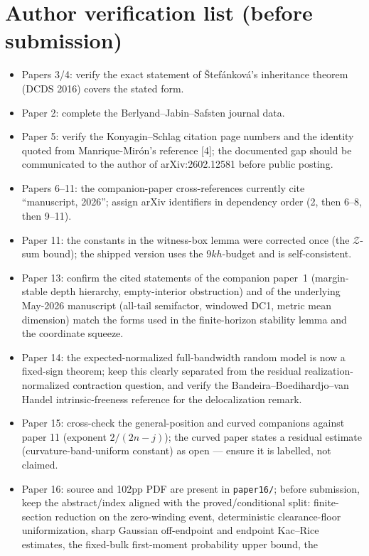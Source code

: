 \documentclass[11pt]{article}
\begin{document}
\section*{Author verification list (before submission)}

\begin{itemize}
\item Papers 3/4: verify the exact statement of \v{S}tef\'ankov\'a's
inheritance theorem (DCDS 2016) covers the stated form.
\item Paper 2: complete the Berlyand--Jabin--Safsten journal data.
\item Paper 5: verify the Konyagin--Schlag citation page numbers and the
identity quoted from Manrique-Mir\'on's reference [4]; the documented gap
should be communicated to the author of arXiv:2602.12581 before public
posting.
\item Papers 6--11: the companion-paper cross-references currently cite
``manuscript, 2026''; assign arXiv identifiers in dependency order (2, then
6--8, then 9--11).
\item Paper 11: the constants in the witness-box lemma were corrected once
(the $\mathcal Z$-sum bound); the shipped version uses the
$9kh$-budget and is self-consistent.
\item Paper 13: confirm the cited statements of the companion paper~1
(margin-stable depth hierarchy, empty-interior obstruction) and of the
underlying May-2026 manuscript (all-tail semifactor, windowed DC1, metric mean
dimension) match the forms used in the finite-horizon stability lemma and the
coordinate squeeze.
\item Paper 14: the expected-normalized full-bandwidth random model is now a
fixed-sign theorem; keep this clearly separated from the residual
realization-normalized contraction question, and verify the
Bandeira--Boedihardjo--van Handel intrinsic-freeness reference for the
delocalization remark.
\item Paper 15: cross-check the general-position and curved companions against
paper 11 (exponent $2/(2n-j)$); the curved paper states a residual estimate
(curvature-band-uniform constant) as open --- ensure it is labelled, not
claimed.
\item Paper 16: source and 102pp PDF are present in \texttt{paper16/}; before
submission, keep the abstract/index aligned with the proved/conditional split:
finite-section reduction on the zero-winding event, deterministic
clearance-floor uniformization, sharp Gaussian off-endpoint and endpoint
Kac--Rice estimates, the fixed-bulk first-moment probability upper bound, the

\end{itemize}
\end{document}
